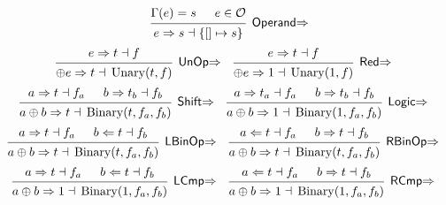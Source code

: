 \documentclass{article}
\DeclareMathOperator{\Binary}{Binary}
\DeclareMathOperator{\Unary}{Unary}
\newcommand{\Syn}{\ensuremath{\Rightarrow}}
\newcommand{\Chk}{\ensuremath{\Leftarrow}}
\newcommand{\s}[3]{\ensuremath{#1 \Syn{} #2 \dashv{} #3}}
\renewcommand{\c}[3]{\ensuremath{#1 \Chk{} #2 \dashv{} #3}}
\begin{document}
\begin{equation*}
  \begin{prooftree}
    \hypo{\Gamma(e) = s}
    \hypo{e \in \mathcal{O}}
    \infer2[\textsf{Operand\Syn}]{\s{e}{s}{\{[]\mapsto s\}}}
  \end{prooftree}
\end{equation*}
\begin{align*}
   &
  \begin{prooftree}
    \hypo{\s{e}{t}{f}}
    \infer1[\textsf{UnOp\Syn}]{\s{\oplus e}{t}{\Unary(t, f)}}
  \end{prooftree}
   &
   &
  \begin{prooftree}
    \hypo{\s{e}{t}{f}}
    \infer1[\textsf{Red\Syn}]{\s{\oplus e}{1}{\Unary(1, f)}}
  \end{prooftree}
\end{align*}
\begin{align*}
   &
  \begin{prooftree}
    \hypo{\s{a}{t}{f_a}}
    \hypo{\s{b}{t_b}{f_b}}
    \infer2[\textsf{Shift\Syn}]{\s{a \oplus b}{t}{\Binary(t, f_a, f_b)}}
  \end{prooftree}
   &
   &
  \begin{prooftree}
    \hypo{\s{a}{t_a}{f_a}}
    \hypo{\s{b}{t_b}{f_b}}
    \infer2[\textsf{Logic\Syn}]{\s{a \oplus b}{1}{\Binary(1, f_a, f_b)}}
  \end{prooftree}
\end{align*}
\begin{align*}
   &
  \begin{prooftree}
    \hypo{\s{a}{t}{f_a}}
    \hypo{\c{b}{t}{f_b}}
    \infer2[\textsf{LBinOp\Syn}]{\s{a\oplus b}{t}{\Binary(t, f_a, f_b)}}
  \end{prooftree}
   &
   &
  \begin{prooftree}
    \hypo{\c{a}{t}{f_a}}
    \hypo{\s{b}{t}{f_b}}
    \infer2[\textsf{RBinOp\Syn}]{\s{a\oplus b}{t}{\Binary(t, f_a, f_b)}}
  \end{prooftree}
\end{align*}
\begin{align*}
   &
  \begin{prooftree}
    \hypo{\s{a}{t}{f_a}}
    \hypo{\c{b}{t}{f_b}}
    \infer2[\textsf{LCmp\Syn}]{\s{a \oplus b}{1}{\Binary(1, f_a, f_b)}}
  \end{prooftree}
   &
   &
  \begin{prooftree}
    \hypo{\c{a}{t}{f_a}}
    \hypo{\s{b}{t}{f_b}}
    \infer2[\textsf{RCmp\Syn}]{\s{a \oplus b}{1}{\Binary(1, f_a, f_b)}}
  \end{prooftree}
\end{align*}
\end{document}
